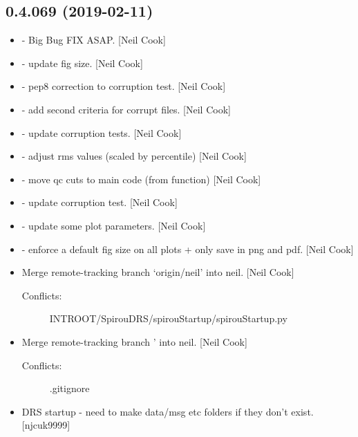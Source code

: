 \documentclass[a4paper,10pt,english]{report}
\begin{document}
\subsection{0.4.069 (2019-02-11)}
\label{\detokenize{misc/changelog:id188}}\begin{itemize}
\item {} 
 - Big Bug FIX ASAP. {[}Neil Cook{]}

\item {} 
 - update  fig size. {[}Neil
Cook{]}

\item {} 
 - pep8 correction to corruption test. {[}Neil Cook{]}

\item {} 
 - add second criteria for corrupt files.
{[}Neil Cook{]}

\item {} 
 - update corruption tests. {[}Neil Cook{]}

\item {} 
 - adjust rms values (scaled by percentile) {[}Neil Cook{]}

\item {} 
 - move qc cuts to main code (from function)
{[}Neil Cook{]}

\item {} 
 - update corruption test. {[}Neil Cook{]}

\item {} 
 - update some plot parameters. {[}Neil Cook{]}

\item {} 
 - enforce a default fig size on all plots + only save in
png and pdf. {[}Neil Cook{]}

\item {} 
Merge remote-tracking branch ‘origin/neil’ into neil. {[}Neil Cook{]}
\begin{description}
\item[{Conflicts:}] \leavevmode
INTROOT/SpirouDRS/spirouStartup/spirouStartup.py

\end{description}

\item {} 
Merge remote-tracking branch ’ into neil. {[}Neil
Cook{]}
\begin{description}
\item[{Conflicts:}] \leavevmode
.gitignore

\end{description}

\item {} 
DRS startup - need to make data/msg etc folders if they don’t exist.
{[}njcuk9999{]}

\end{itemize}
\end{document}
